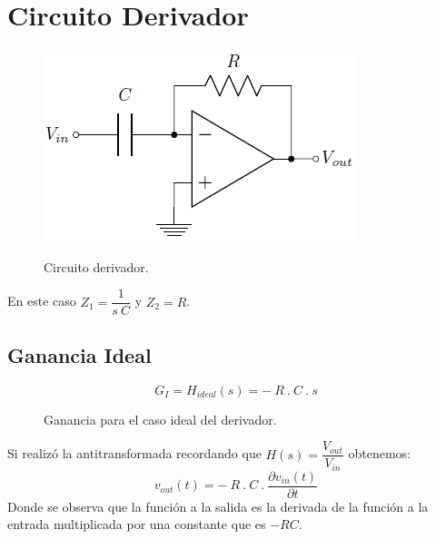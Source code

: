 \documentclass[11pt, a4paper]{article}
\begin{document}
\section{Circuito Derivador}

\begin{figure}[h!]
\centering
\includegraphics[scale=0.5]{circuitoderivador.png}
\label{circuitoderivador}
\caption{Circuito derivador.}
\end{figure}
En este caso $Z_1=\dfrac{1}{s \ C}$ y $Z_2= R$.

\subsection{Ganancia Ideal}

\begin{equation}
G_I=H_{ideal}(s)= - \ R \ . \ C \ . \ s
\end{equation}


\begin{center}
	\begin{figure}[h!]	
	\label{avolidealderivador}
	\caption{Ganancia para el caso ideal del derivador.}
	\end{figure}
\end{center}

Si realizó la antitransformada recordando que $H(s)= \dfrac{V_{out}}{V_{in}}$ obtenemos:
\begin{equation} 
v_{out} (t) = - \ R \ . \ C \ . \ \dfrac{\partial v_{in}(t)}{\partial t}
\end{equation}
Donde se observa que la función a la salida es la derivada de la función a la entrada multiplicada por una constante que es $- R C$.
\end{document}

